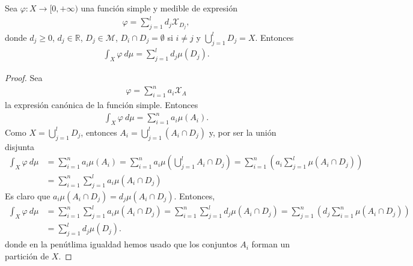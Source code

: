 \begin{prop}
    Sea $\varphi: X \longrightarrow [0,+\infty)$ una función simple y medible de expresión
    \begin{align*}
        \varphi = \sum_{j=1}^{l}{d_j \mathcal{X}_{D_j}},
    \end{align*}
    donde $d_j \ge 0$, $d_j \in \mathbb{R}$, $D_j \in \mathcal{M}$, $D_i \cap D_j = \emptyset$ si $i \not = j$ y $\bigcup_{j=1}^{l}{D_j} = X$. Entonces
    \begin{align*}
        \int_{X}{\varphi \ d\mu} = \sum_{j=1}^{l}{d_j \mu(D_j)}.
    \end{align*}
\end{prop}

\begin{proof}
    Sea
    \begin{align*}
        \varphi = \sum_{i=1}^{n}{a_i \mathcal{X}_A}
    \end{align*}
    la expresión canónica de la función simple. Entonces
    \begin{align*}
        \int_{X}{\varphi \ d\mu} = \sum_{i=1}^{n}{a_i\mu(A_i)}.
    \end{align*}
    Como $X = \bigcup_{j=1}^{l}{D_j}$, entonces $A_i = \bigcup_{j=1}^{l}{(A_i \cap D_j)}$ y, por ser la unión disjunta
    \begin{align*}
        \int_{X}{\varphi \ d\mu} & = \sum_{i=1}^{n}{a_i\mu(A_i)} = \sum_{i=1}^{n}{a_i\mu \left(\bigcup_{j=1}^{l}{A_i \cap D_j}\right)} = \sum_{i=1}^{n}{ \left( a_i \sum_{j=1}^{l}{\mu(A_i \cap D_j)}\right)} \\
                                 & = \sum_{i=1}^{n}{\sum_{j=1}^{l}{a_i\mu(A_i \cap D_j)}}
    \end{align*}
    Es claro que $a_i \mu(A_i \cap D_j) = d_j \mu(A_i \cap D_j)$. Entonces,
    \begin{align*}
        \int_{X}{\varphi \ d\mu} & = \sum_{i=1}^{n}{\sum_{j=1}^{l}{a_i\mu(A_i \cap D_j)}} = \sum_{i=1}^{n}{\sum_{j=1}^{l}{d_j\mu(A_i \cap D_j)}} = \sum_{j=1}^{n}{ \left( d_j\sum_{i=1}^{n}{\mu(A_i \cap D_j)} \right)} \\
                                 & = \sum_{j=1}^{l}{d_j \mu(D_j)}.
    \end{align*}
    donde en la penútlima igualdad hemos usado que los conjuntos $A_i$ forman un partición de $X$.
\end{proof}

